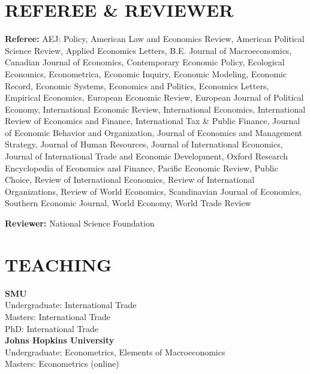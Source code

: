 \documentclass[11pt]{res}
\begin{document}
\begin{resume}
\section{REFEREE \& REVIEWER} \vspace{1.5mm}
{\bf Referee:} AEJ: Policy, American Law and Economics Review, American Political Science Review, Applied Economics Letters, B.E. Journal of Macroeconomics, Canadian Journal of Economics, Contemporary Economic Policy, Ecological Economics, Econometrica, Economic Inquiry, Economic Modeling, Economic Record, Economic Systems, Economics and Politics, Economics Letters, Empirical Economics, European Economic Review, European Journal of Political Economy, International Economic Review, International Economics, International Review of Economics and Finance, International Tax \& Public Finance, Journal of Economic Behavior and Organization, Journal of Economics and Management Strategy, Journal of Human Resources, Journal of International Economics, Journal of International Trade and Economic Development, Oxford Research Encyclopedia of Economics and Finance, Pacific Economic Review, Public Choice, Review of International Economics, Review of International Organizations, Review of World Economics, Scandinavian Journal of Economics, Southern Economic Journal, World Economy, World Trade Review

{\bf Reviewer:} National Science Foundation

\pagebreak

\section{TEACHING} \vspace{1.5mm}
\textbf{SMU}\vspace{1.5mm}\\
Undergraduate: International Trade\vspace{1.5mm}\\
Masters: International Trade\vspace{1.5mm}\\
PhD: International Trade\vspace{4mm}\\
\textbf{Johns Hopkins University}\vspace{1.5mm}\\
Undergraduate: Econometrics, Elements of Macroeconomics\vspace{1.5mm}\\
Masters: Econometrics (online)


\end{resume}
\end{document}
